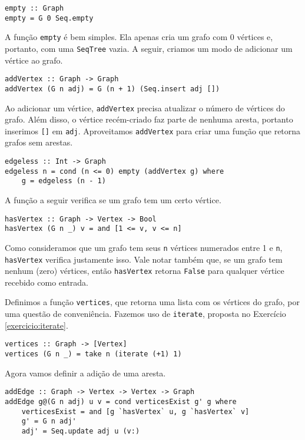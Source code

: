 \documentclass[a4paper]{article}
\begin{document}
\begin{verbatim}
empty :: Graph
empty = G 0 Seq.empty
\end{verbatim}

A função \texttt{empty} é bem simples.
Ela apenas cria um grafo com 0 vértices e, portanto, com uma \texttt{SeqTree} vazia.
A seguir, criamos um modo de adicionar um vértice ao grafo.

\begin{verbatim}
addVertex :: Graph -> Graph
addVertex (G n adj) = G (n + 1) (Seq.insert adj [])
\end{verbatim}

Ao adicionar um vértice, \texttt{addVertex} precisa atualizar o número de vértices do grafo.
Além disso, o vértice recém-criado faz parte de nenhuma aresta, portanto inserimos \texttt{[]} em \texttt{adj}.
Aproveitamos \texttt{addVertex} para criar uma função que retorna grafos sem arestas.

\begin{verbatim}
edgeless :: Int -> Graph
edgeless n = cond (n <= 0) empty (addVertex g) where
	g = edgeless (n - 1)
\end{verbatim}

A função a seguir verifica se um grafo tem um certo vértice.

\begin{verbatim}
hasVertex :: Graph -> Vertex -> Bool
hasVertex (G n _) v = and [1 <= v, v <= n]
\end{verbatim}

Como consideramos que um grafo tem seus \texttt{n} vértices numerados entre 1 e \texttt{n}, \texttt{hasVertex} verifica justamente isso.
Vale notar também que, se um grafo tem nenhum (zero) vértices, então \texttt{hasVertex} retorna \texttt{False} para qualquer vértice recebido como entrada.

Definimos a função \texttt{vertices}, que retorna uma lista com os vértices do grafo, por uma questão de conveniência.
Fazemos uso de \texttt{iterate}, proposta no Exercício \ref{exercicio:iterate}.

\begin{verbatim}
vertices :: Graph -> [Vertex]
vertices (G n _) = take n (iterate (+1) 1)
\end{verbatim}

Agora vamos definir a adição de uma aresta.

\begin{verbatim}
addEdge :: Graph -> Vertex -> Vertex -> Graph
addEdge g@(G n adj) u v = cond verticesExist g' g where
	verticesExist = and [g `hasVertex` u, g `hasVertex` v]
	g' = G n adj'
	adj' = Seq.update adj u (v:)
\end{verbatim}
\end{document}
